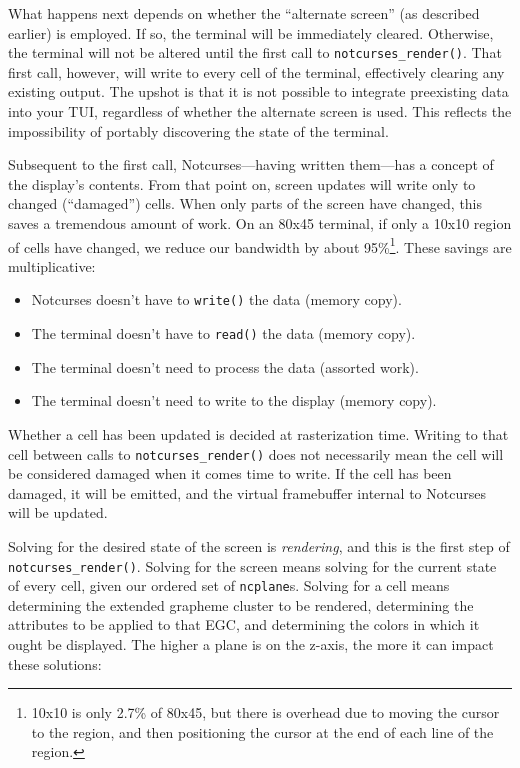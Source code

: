 \documentclass[letterpaper,10pt]{article}
\newenvironment{denseitemize}{
  \begin{itemize}
      \setlength{\itemsep}{0pt}
}{
  \end{itemize}
}
\begin{document}
What happens next depends on whether the ``alternate screen'' (as described
earlier) is employed. If so, the terminal will be immediately cleared.
Otherwise, the terminal will not be altered until the first call to
\texttt{notcurses\_render()}. That first call, however, will write to every
cell of the terminal, effectively clearing any existing output. The upshot is
that it is not possible to integrate preexisting data into your TUI, regardless
of whether the alternate screen is used. This reflects the impossibility of
portably discovering the state of the terminal.

Subsequent to the first call, Notcurses---having written them---has a concept
of the display's contents. From that point on, screen updates will write only
to changed (``damaged'') cells. When only parts of the screen have changed,
this saves a tremendous amount of work. On an 80x45 terminal, if only a 10x10
region of cells have changed, we reduce our bandwidth by about
95\%\footnote{10x10 is only 2.7\% of 80x45, but there is overhead due to moving
the cursor to the region, and then positioning the cursor at the end of each
line of the region.}. These savings are multiplicative:

\begin{denseitemize}
\item{Notcurses doesn't have to \texttt{write()} the data (memory copy).}
\item{The terminal doesn't have to \texttt{read()} the data (memory copy).}
\item{The terminal doesn't need to process the data (assorted work).}
\item{The terminal doesn't need to write to the display (memory copy).}
\end{denseitemize}

Whether a cell has been updated is decided at rasterization time. Writing to
that cell between calls to \texttt{notcurses\_render()} does not necessarily
mean the cell will be considered damaged when it comes time to write. If the
cell has been damaged, it will be emitted, and the virtual framebuffer internal
to Notcurses will be updated.

Solving for the desired state of the screen is \textit{rendering}, and this is
the first step of \texttt{notcurses\_render()}. Solving for the screen means
solving for the current state of every cell, given our ordered set of
\texttt{ncplane}s. Solving for a cell means determining the extended grapheme
cluster to be rendered, determining the attributes to be applied to that EGC,
and determining the colors in which it ought be displayed. The higher a plane
is on the z-axis, the more it can impact these solutions:
\end{document}
